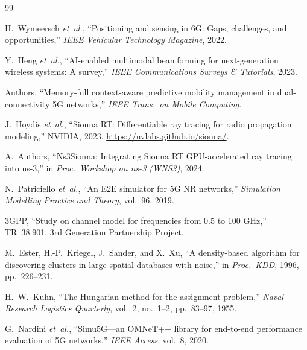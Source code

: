 \begin{thebibliography}{99}

H.~Wymeersch \emph{et~al.}, ``Positioning and sensing in 6G: Gaps,
challenges, and opportunities,'' \emph{IEEE Vehicular Technology Magazine},
2022. %

Y.~Heng \emph{et~al.}, ``AI-enabled multimodal beamforming for next-generation
wireless systems: A survey,'' \emph{IEEE Communications Surveys \& Tutorials},
2023. %

Authors, ``Memory-full context-aware predictive mobility management in
dual-connectivity 5G networks,'' \emph{IEEE Trans.\ on Mobile Computing}.

J.~Hoydis \emph{et~al.}, ``Sionna RT: Differentiable ray tracing for radio
propagation modeling,'' NVIDIA, 2023.
\url{https://nvlabs.github.io/sionna/}. %

A.~Authors, ``Ns3Sionna: Integrating Sionna RT GPU-accelerated ray tracing
into ns-3,'' in \emph{Proc.\ Workshop on ns-3 (WNS3)}, 2024.

N.~Patriciello \emph{et~al.}, ``An E2E simulator for 5G NR networks,''
\emph{Simulation Modelling Practice and Theory}, vol.~96, 2019.

3GPP, ``Study on channel model for frequencies from 0.5 to 100 GHz,''
TR~38.901, 3rd Generation Partnership Project. %

M.~Ester, H.-P.~Kriegel, J.~Sander, and X.~Xu, ``A density-based algorithm
for discovering clusters in large spatial databases with noise,'' in
\emph{Proc.\ KDD}, 1996, pp.~226--231.

H.~W.~Kuhn, ``The Hungarian method for the assignment problem,''
\emph{Naval Research Logistics Quarterly}, vol.~2, no.~1--2,
pp.~83--97, 1955.

G.~Nardini \emph{et~al.}, ``Simu5G---an OMNeT++ library for end-to-end
performance evaluation of 5G networks,'' \emph{IEEE Access},
vol.~8, 2020. %

\end{thebibliography}
